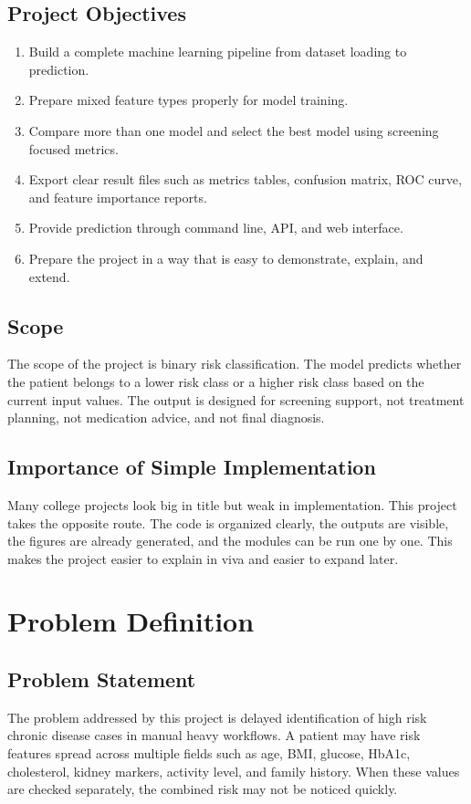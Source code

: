 \documentclass[12pt,a4paper,openany]{report}
\begin{document}
    \section{Project Objectives}
    \begin{enumerate}[leftmargin=1.4cm]
    \item Build a complete machine learning pipeline from dataset loading to prediction.
    \item Prepare mixed feature types properly for model training.
    \item Compare more than one model and select the best model using screening focused metrics.
    \item Export clear result files such as metrics tables, confusion matrix, ROC curve, and feature importance reports.
    \item Provide prediction through command line, API, and web interface.
    \item Prepare the project in a way that is easy to demonstrate, explain, and extend.
    \end{enumerate}

    \section{Scope}
    The scope of the project is binary risk classification. The model predicts whether the patient belongs to a lower risk class or a higher risk class based on the current input values. The output is designed for screening support, not treatment planning, not medication advice, and not final diagnosis.

    \section{Importance of Simple Implementation}
    Many college projects look big in title but weak in implementation. This project takes the opposite route. The code is organized clearly, the outputs are visible, the figures are already generated, and the modules can be run one by one. This makes the project easier to explain in viva and easier to expand later.

    \chapter{Problem Definition}
    \section{Problem Statement}
    The problem addressed by this project is delayed identification of high risk chronic disease cases in manual heavy workflows. A patient may have risk features spread across multiple fields such as age, BMI, glucose, HbA1c, cholesterol, kidney markers, activity level, and family history. When these values are checked separately, the combined risk may not be noticed quickly.
\end{document}
